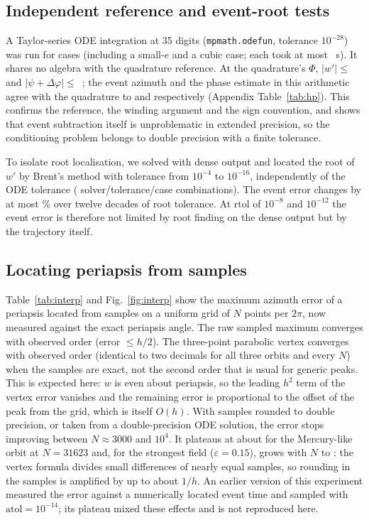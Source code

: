 \documentclass[11pt,a4paper]{article}
\newcommand{\dphi}{\Delta\varphi}
\begin{document}
\subsection{Independent reference and event-root tests}
\label{sec:hp}
A Taylor-series ODE integration at 35 digits (\texttt{mpmath.odefun}, tolerance $10^{-28}$) was run for \HPn{} cases (including a small-$e$ and a cubic case; each took at most \HPmaxSec{}~s). It shares no algebra with the quadrature reference. At the quadrature's $\Phi$, $|w'|\le$~\HPmaxW{} and $|\psi+\dphi|\le$~\HPmaxPsi{}; the event azimuth and the phase estimate in this arithmetic agree with the quadrature to \HPmaxEvent{} and \HPmaxPhase{} respectively (Appendix Table~\ref{tab:hp}). This confirms the reference, the winding argument and the sign convention, and shows that event subtraction itself is unproblematic in extended precision, so the conditioning problem belongs to double precision with a finite tolerance.

To isolate root localisation, we solved with dense output and located the root of $w'$ by Brent's method with tolerance from $10^{-4}$ to $10^{-16}$, independently of the ODE tolerance (\RootRuns{} solver/tolerance/case combinations). The event error changes by at most \RootChangeMax\% over twelve decades of root tolerance. At $\mathrm{rtol}$ of $10^{-8}$ and $10^{-12}$ the event error is therefore not limited by root finding on the dense output but by the trajectory itself.

\subsection{Locating periapsis from samples}
Table~\ref{tab:interp} and Fig.~\ref{fig:interp} show the maximum azimuth error of a periapsis located from samples on a uniform grid of $N$ points per $2\pi$, now measured against the exact periapsis angle. The raw sampled maximum converges with observed order \OrderRaw{} (error $\le h/2$). The three-point parabolic vertex converges with observed order \OrderExactMin{} (identical to two decimals for all three orbits and every $N$) when the samples are exact, not the second order that is usual for generic peaks. This is expected here: $w$ is even about periapsis, so the leading $h^2$ term of the vertex error vanishes and the remaining error is proportional to the offset of the peak from the grid, which is itself $O(h)$. With samples rounded to double precision, or taken from a double-precision ODE solution, the error stops improving between $N\approx3000$ and $10^4$. It plateaus at about \FloorMerc{} for the Mercury-like orbit at $N=31623$ and, for the strongest field ($\varepsilon=0.15$), grows with $N$ to \FloorHigh{}: the vertex formula divides small differences of nearly equal samples, so rounding in the samples is amplified by up to about $1/h$. An earlier version of this experiment measured the error against a numerically located event time and sampled with $\mathrm{atol}=10^{-14}$; its plateau mixed these effects and is not reproduced here.
\end{document}
